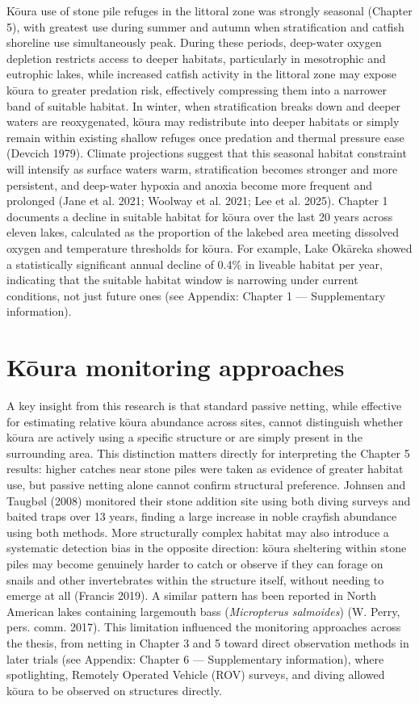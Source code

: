 \documentclass[
  12pt,
  a4paper,
  oneside]{scrbook}
\begin{document}
Kōura use of stone pile refuges in the littoral zone was strongly
seasonal (Chapter 5), with greatest use during summer and autumn when
stratification and catfish shoreline use simultaneously peak. During
these periods, deep-water oxygen depletion restricts access to deeper
habitats, particularly in mesotrophic and eutrophic lakes, while
increased catfish activity in the littoral zone may expose kōura to
greater predation risk, effectively compressing them into a narrower
band of suitable habitat. In winter, when stratification breaks down and
deeper waters are reoxygenated, kōura may redistribute into deeper
habitats or simply remain within existing shallow refuges once predation
and thermal pressure ease (Devcich 1979). Climate projections suggest
that this seasonal habitat constraint will intensify as surface waters
warm, stratification becomes stronger and more persistent, and
deep-water hypoxia and anoxia become more frequent and prolonged ({Jane
et al.} 2021; Woolway et al. 2021; Lee et al. 2025). Chapter 1 documents
a decline in suitable habitat for kōura over the last 20 years across
eleven lakes, calculated as the proportion of the lakebed area meeting
dissolved oxygen and temperature thresholds for kōura. For example, Lake
Ōkāreka showed a statistically significant annual decline of 0.4\% in
liveable habitat per year, indicating that the suitable habitat window
is narrowing under current conditions, not just future ones (see
Appendix: Chapter 1 --- Supplementary information).

\section{Kōura monitoring approaches}\label{koura-monitoring-approaches}

A key insight from this research is that standard passive netting, while
effective for estimating relative kōura abundance across sites, cannot
distinguish whether kōura are actively using a specific structure or are
simply present in the surrounding area. This distinction matters
directly for interpreting the Chapter 5 results: higher catches near
stone piles were taken as evidence of greater habitat use, but passive
netting alone cannot confirm structural preference. Johnsen and Taugbøl
(2008) monitored their stone addition site using both diving surveys and
baited traps over 13 years, finding a large increase in noble crayfish
abundance using both methods. More structurally complex habitat may also
introduce a systematic detection bias in the opposite direction: kōura
sheltering within stone piles may become genuinely harder to catch or
observe if they can forage on snails and other invertebrates within the
structure itself, without needing to emerge at all (Francis 2019). A
similar pattern has been reported in North American lakes containing
largemouth bass (\emph{Micropterus salmoides}) (W. Perry, pers. comm.
2017). This limitation influenced the monitoring approaches across the
thesis, from netting in Chapter 3 and 5 toward direct observation
methods in later trials (see Appendix: Chapter 6 --- Supplementary
information), where spotlighting, Remotely Operated Vehicle (ROV)
surveys, and diving allowed kōura to be observed on structures directly.
\end{document}
